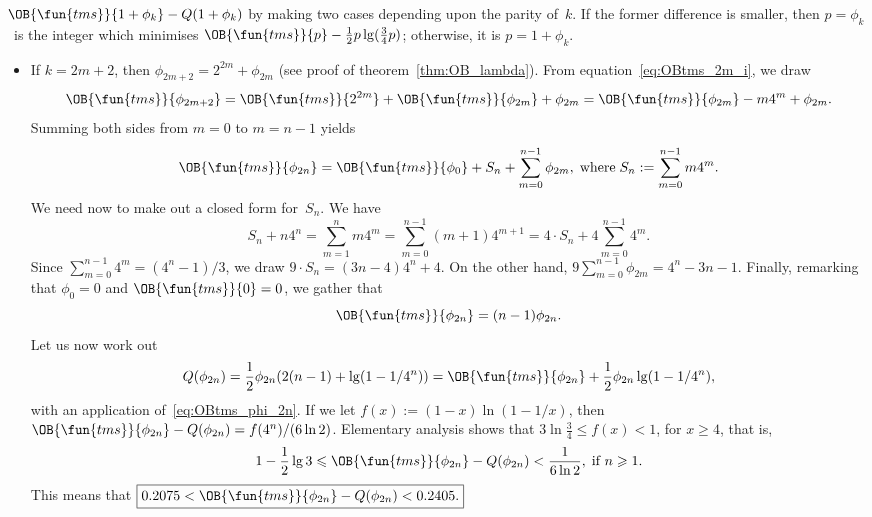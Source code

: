 \(\OB{\fun{tms}}{1+\phi_k} - Q(1+\phi_k)\) by making two cases
depending upon the parity of~\(k\). If the former difference is
smaller, then \(p=\phi_k\)~is the integer which minimises
\(\OB{\fun{tms}}{p} - \tfrac{1}{2}p\lg(\tfrac{3}{4}p)\); otherwise, it
is \(p=1+\phi_k\).
\begin{itemize}

  \item If \(k=2m+2\), then \(\phi_{2m+2} = 2^{2m} + \phi_{2m}\) (see
    proof of theorem~\ref{thm:OB_lambda}). From
    equation~\eqref{eq:OBtms_2m_i}, we draw
    \begin{equation*}
      \OB{\fun{tms}}{\phi_{2m+2}} = \OB{\fun{tms}}{2^{2m}} +
    \OB{\fun{tms}}{\phi_{2m}} + \phi_{2m} = \OB{\fun{tms}}{\phi_{2m}}
    - m4^m + \phi_{2m}.
    \end{equation*}
    Summing both sides from \(m=0\) to \(m=n-1\) yields
    \begin{equation*}
      \OB{\fun{tms}}{\phi_{2n}} = \OB{\fun{tms}}{\phi_0} + S_n
    + \sum_{m=0}^{n-1}{\phi_{2m}},\; \text{where}\; S_n :=
    \sum_{m=0}^{n-1}{m4^m}.
    \end{equation*}
    We need now to make out a closed form for~\(S_n\). We have
    \begin{equation*}
      S_n + n4^n = \sum_{m=1}^{n}{m4^m}
                 = \sum_{m=0}^{n-1}(m+1)4^{m+1}
                 = 4 \cdot S_n + 4\sum_{m=0}^{n-1}4^m.
    \end{equation*}
    Since \(\sum_{m=0}^{n-1}4^m = (4^n-1)/3\), we draw \(9 \cdot S_n =
    (3n -4)4^n + 4\). On the other hand, \(9
    \sum_{m=0}^{n-1}{\phi_{2m}} = 4^n - 3n - 1\). Finally, remarking
    that \(\phi_0 = 0\) and \(\OB{\fun{tms}}{0} = 0\), we gather that
    \begin{equation}
      \OB{\fun{tms}}{\phi_{2n}} = (n-1)\phi_{2n}.
    \label{eq:OBtms_phi_2n}
    \end{equation}
    Let us now work out
    \begin{equation*}
      Q(\phi_{2n}) = \frac{1}{2}\phi_{2n}(2(n-1)
      + \lg(1-1/4^n)) = \OB{\fun{tms}}{\phi_{2n}}
      + \frac{1}{2}\phi_{2n}\lg(1-1/4^n),
    \end{equation*}
    with an application of~\eqref{eq:OBtms_phi_2n}. If we let \(f(x) := (1-x)
    \ln(1-1/x)\), then \(\OB{\fun{tms}}{\phi_{2n}} - Q(\phi_{2n}) =
    f(4^n)/(6\ln 2)\). Elementary analysis shows that
    \(3\ln\tfrac{3}{4} \leqslant f(x) < 1\), for \(x \geqslant 4\),
    that is,
    \begin{equation*}
      1 - \frac{1}{2}\lg 3 \leqslant
    \OB{\fun{tms}}{\phi_{2n}} - Q(\phi_{2n}) < \frac{1}{6\ln 2},\; \text{if \(n
      \geqslant 1\)}.
    \end{equation*}
    This means that \(\boxed{0.2075 <
    \smash{\OB{\fun{tms}}{\phi_{2n}}} - Q(\phi_{2n}) < 0.2405.}\)


\end{itemize}

